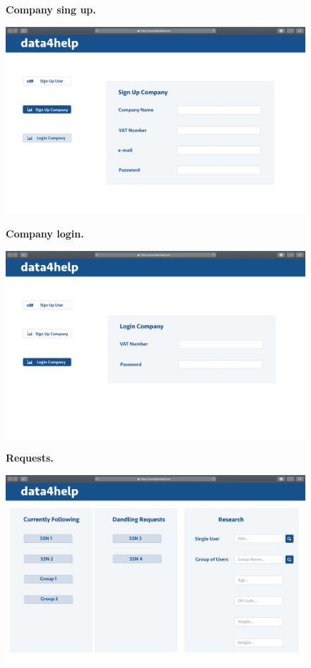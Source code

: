 \documentclass{article}
\begin{document}
\begin{figure}[h!]
\centering
    \textbf{Company sing up.}\par\medskip
	\includegraphics[width= \linewidth]{3signupcompany.png}
\end{figure}
\begin{figure}[h!]
\centering
    \textbf{Company login.}\par\medskip
	\includegraphics[width= \linewidth]{4logincompany.png}
\end{figure}\newpage
\begin{figure}[h!]
\centering
    \textbf{Requests.}\par\medskip
	\includegraphics[width= \linewidth]{5companyhompage.png}
\end{figure}
\end{document}
